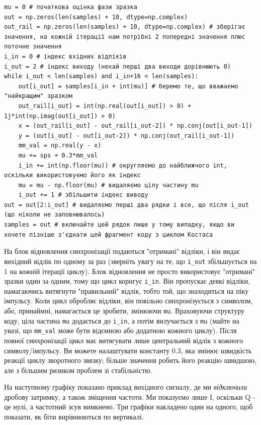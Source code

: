 \begin{Verbatim}[breaklines=true,breakanywhere=true,fontsize=\small]
mu = 0 # початкова оцінка фази зразка
out = np.zeros(len(samples) + 10, dtype=np.complex)
out_rail = np.zeros(len(samples) + 10, dtype=np.complex) # зберігає значення, на кожній ітерації нам потрібні 2 попередні значення плюс поточне значення
i_in = 0 # індекс вхідних відліків
i_out = 2 # індекс виходу (нехай перші два виходи дорівнюють 0)
while i_out < len(samples) and i_in+16 < len(samples):
    out[i_out] = samples[i_in + int(mu)] # беремо те, що вважаємо "найкращим" зразком
    out_rail[i_out] = int(np.real(out[i_out]) > 0) + 1j*int(np.imag(out[i_out]) > 0)
    x = (out_rail[i_out] - out_rail[i_out-2]) * np.conj(out[i_out-1])
    y = (out[i_out] - out[i_out-2]) * np.conj(out_rail[i_out-1])
    mm_val = np.real(y - x)
    mu += sps + 0.3*mm_val
    i_in += int(np.floor(mu)) # округляємо до найближчого int, оскільки використовуємо його як індекс
    mu = mu - np.floor(mu) # видаляємо цілу частину mu
    i_out += 1 # збільшити індекс виводу
out = out[2:i_out] # видаляємо перші два рядки і все, що після i_out (що ніколи не заповнювалось)
samples = out # включайте цей рядок лише у тому випадку, якщо ви хочете пізніше з'єднати цей фрагмент коду з циклом Костаса
\end{Verbatim}

На блок відновлення синхронізації подаються "отримані" відліки, і він
видає вихідний відлік по одному за раз (зверніть увагу на те, що
\texttt{i\_out} збільшується на 1 на кожній ітерації циклу). Блок
відновлення не просто використовує "отримані" зразки один за одним, тому
що цикл коригує \texttt{i\_in}. Він пропускає деякі відліки, намагаючись
витягнути "правильний" відлік, тобто той, що знаходиться на піку
імпульсу. Коли цикл обробляє відліки, він повільно синхронізується з
символом, або, принаймні, намагається це зробити, змінюючи \texttt{mu}.
Враховуючи структуру коду, ціла частина \texttt{mu} додається до
\texttt{i\_in}, а потім вилучається з \texttt{mu} (майте на увазі, що
\texttt{mm\_val} може бути від\textquotesingle ємною або додатною
кожного циклу). Після повної синхронізації цикл має витягувати лише
центральний відлік з кожного символу/імпульсу. Ви можете налаштувати
константу 0.3, яка змінює швидкість реакції циклу зворотного
зв\textquotesingle язку; більше значення робить його реакцію швидшою,
але з більшим ризиком проблем зі стабільністю.

На наступному графіку показано приклад вихідного сигналу, де ми
\emph{відключили} дробову затримку, а також зміщення частоти. Ми
показуємо лише I, оскільки Q - це нулі, а частотний зсув вимкнено. Три
графіки накладено один на одного, щоб показати, як біти вирівнюються по
вертикалі.

